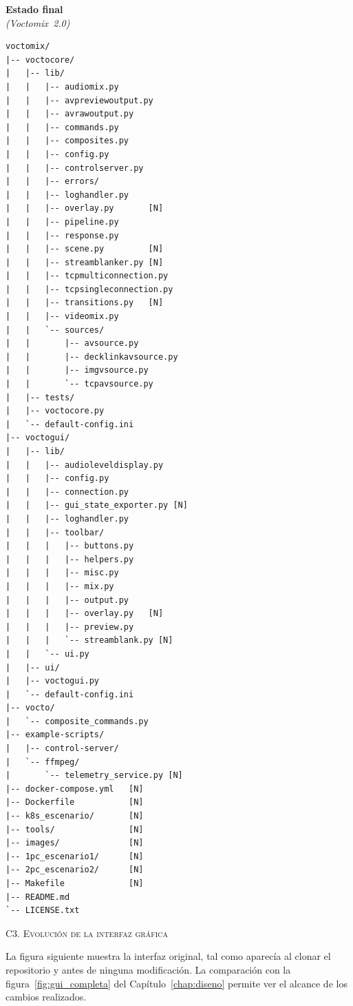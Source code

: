 \begin{minipage}[t]{0.47\textwidth}
  {\centering\small\textbf{Estado final}\\[2pt]\small\textit{(Voctomix~2.0)}\par}
  \vspace{0.15cm}
  \scriptsize
  \begin{verbatim}
voctomix/
|-- voctocore/
|   |-- lib/
|   |   |-- audiomix.py
|   |   |-- avpreviewoutput.py
|   |   |-- avrawoutput.py
|   |   |-- commands.py
|   |   |-- composites.py
|   |   |-- config.py
|   |   |-- controlserver.py
|   |   |-- errors/
|   |   |-- loghandler.py
|   |   |-- overlay.py       [N]
|   |   |-- pipeline.py
|   |   |-- response.py
|   |   |-- scene.py         [N]
|   |   |-- streamblanker.py [N]
|   |   |-- tcpmulticonnection.py
|   |   |-- tcpsingleconnection.py
|   |   |-- transitions.py   [N]
|   |   |-- videomix.py
|   |   `-- sources/
|   |       |-- avsource.py
|   |       |-- decklinkavsource.py
|   |       |-- imgvsource.py
|   |       `-- tcpavsource.py
|   |-- tests/
|   |-- voctocore.py
|   `-- default-config.ini
|-- voctogui/
|   |-- lib/
|   |   |-- audioleveldisplay.py
|   |   |-- config.py
|   |   |-- connection.py
|   |   |-- gui_state_exporter.py [N]
|   |   |-- loghandler.py
|   |   |-- toolbar/
|   |   |   |-- buttons.py
|   |   |   |-- helpers.py
|   |   |   |-- misc.py
|   |   |   |-- mix.py
|   |   |   |-- output.py
|   |   |   |-- overlay.py   [N]
|   |   |   |-- preview.py
|   |   |   `-- streamblank.py [N]
|   |   `-- ui.py
|   |-- ui/
|   |-- voctogui.py
|   `-- default-config.ini
|-- vocto/
|   `-- composite_commands.py
|-- example-scripts/
|   |-- control-server/
|   `-- ffmpeg/
|       `-- telemetry_service.py [N]
|-- docker-compose.yml   [N]
|-- Dockerfile           [N]
|-- k8s_escenario/       [N]
|-- tools/               [N]
|-- images/              [N]
|-- 1pc_escenario1/      [N]
|-- 2pc_escenario2/      [N]
|-- Makefile             [N]
|-- README.md
`-- LICENSE.txt
  \end{verbatim}
\end{minipage}

\clearpage

\Large{\textsc{\textcolor{nar}{C3. Evolución de la interfaz gráfica}}}
\vspace{0.2cm}

\normalsize{La figura siguiente muestra la interfaz original, tal como aparecía al clonar
el repositorio y antes de ninguna modificación. La comparación con la
figura~\ref{fig:gui_completa} del Capítulo~\ref{chap:diseno} permite ver el alcance de
los cambios realizados.}
\vspace{0.2cm}

